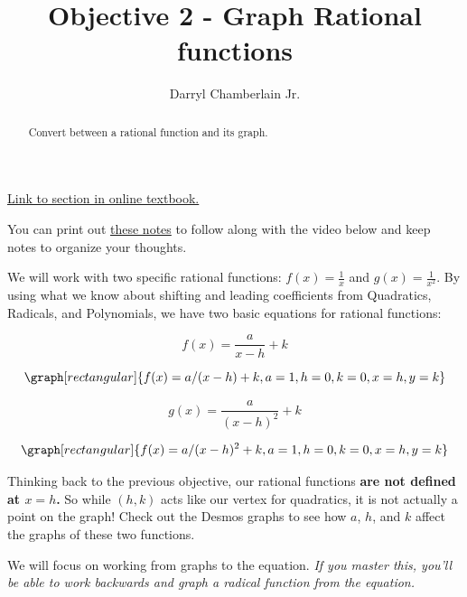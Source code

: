 \documentclass{ximera}
\author{Darryl Chamberlain Jr.}
\title{Objective 2 - Graph Rational functions}
\begin{document}
\begin{abstract}
Convert between a rational function and its graph.
\end{abstract}
\maketitle

\href{https://cnx.org/contents/mwjClAV_@8.1:KNTP2r7D@13/Rational-Functions}{Link to section in online textbook.}


You can print out \href{http://people.clas.ufl.edu/dchamberlain31/files/M7-Objective-2-Graph-Rational-Functions.pdf}{these notes} to follow along with the video below and keep notes to organize your thoughts.


We will work with two specific rational functions: $f(x) = \frac{1}{x}$ and $g(x)=\frac{1}{x^2}$. By using what we know about shifting and leading coefficients from Quadratics, Radicals, and Polynomials, we have two basic equations for rational functions: 

$$ f(x) = \frac{a}{x-h} + k $$

\[
\graph[rectangular]{f(x) = a/(x-h) + k, a=1, h=0, k=0, x=h, y=k}
\]

$$ g(x) = \frac{a}{(x-h)^2} + k $$

\[
\graph[rectangular]{f(x) = a/(x-h)^2 + k, a=1, h=0, k=0, x=h, y=k}
\]

Thinking back to the previous objective, our rational functions \textbf{are not defined at $x=h$.} So while $(h, k)$ acts like our vertex for quadratics, it is not actually a point on the graph! Check out the Desmos graphs to see how $a$, $h$, and $k$ affect the graphs of these two functions. 

We will focus on working from graphs to the equation. \textit{If you master this, you'll be able to work backwards and graph a radical function from the equation.} 
\end{document}
